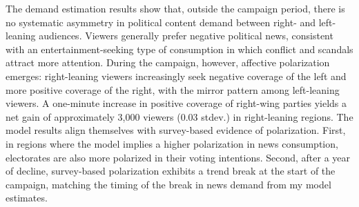 \documentclass[12pt]{article}
\begin{document}







The demand estimation results show that, outside the campaign period, there is no systematic asymmetry in political content demand between right- and left-leaning audiences. Viewers generally prefer negative political news, consistent with an entertainment-seeking type of consumption in which conflict and scandals attract more attention. During the campaign, however, affective polarization emerges: right-leaning viewers increasingly seek negative coverage of the left and more positive coverage of the right, with the mirror pattern among left-leaning viewers. A one-minute increase in positive coverage of right-wing parties yields a net gain of approximately 3,000 viewers (0.03 stdev.)  in right-leaning regions. The model results align  themselves with survey-based evidence of polarization. First, in regions where the model implies a higher polarization in news consumption, electorates are also more polarized in their voting intentions. Second, after a year of decline, survey-based polarization exhibits a trend break at the start of the campaign, matching the timing of the break in news demand  from my model estimates.
\end{document}
